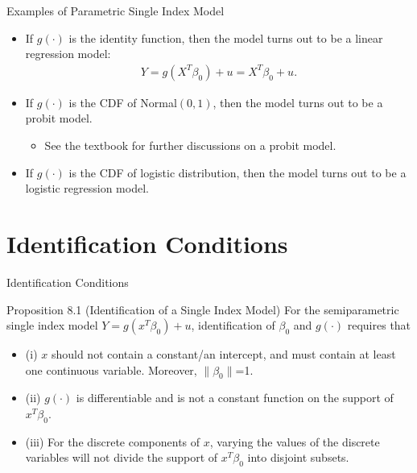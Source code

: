 \documentclass[xcolor=svgnames,dvipdfmx,cjk]{beamer}
\theoremstyle{example}
\begin{document}
\begin{frame}{Examples of Parametric Single Index Model}
  \begin{itemize}
    \item If $g(\cdot)$ is the identity function, 
          then the model turns out to be \alert{a linear regression model}:
          \begin{align*}
            Y = g (X^{T} \beta_0) + u = X^{T} \beta_0 + u.
          \end{align*}
    \item If $g(\cdot)$ is the CDF of Normal$(0, 1)$,
          then the model turns out to be \alert{a probit model}.
          \begin{itemize}
            \item See the textbook for further discussions on a probit model.
          \end{itemize}
    \item If $g(\cdot)$ is the CDF of logistic distribution,
          then the model turns out to be \alert{a logistic regression model}.
  \end{itemize}
  
\end{frame}


\section{Identification Conditions}

\begin{frame}{Identification Conditions}
  \begin{itembox}[l]{Proposition 8.1 (Identification of a Single Index Model)}
    \quad 
    For the semiparametric single index model $Y = g(x^{T} \beta_0) + u$,
    identification of $\beta_0$ and $g(\cdot)$ requires that
    \begin{itemize}
      \item (i)
            $x$ should not contain a constant/an intercept, 
            and must contain at least one continuous variable.
            Moreover, $\|\beta_0\|$=1.
      \item (ii)
            $g(\cdot)$ is differentiable 
            and is not a constant function on the support of $x^{T}\beta_0$.
      \item (iii)
            For the discrete components of $x$, 
            varying the values of the discrete variables will not divide the support of $x^{T}\beta_0$ into disjoint subsets.
    \end{itemize}
  \end{itembox}
\end{frame}
\end{document}
